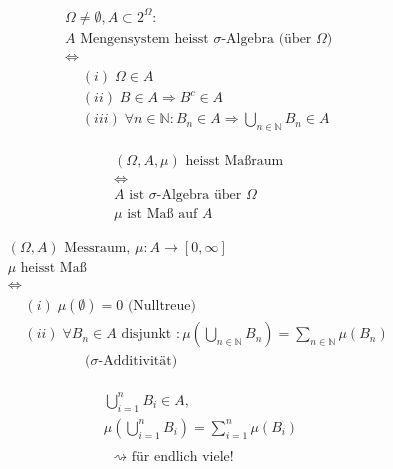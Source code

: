 \documentclass[a4paper]{article}
\begin{document}
{	{
		\begin{gather*}
			\Omega \neq \emptyset,
			A
			\subset 2 ^{\Omega}: \\
			A \text{ Mengensystem heisst $\sigma$-Algebra (über $\Omega$) } \\
			\Leftrightarrow \\
			\begin{align*}
				&(i) \; \Omega \in A \\
				&(ii) \; B \in A \Rightarrow B ^{c} \in A \\
				&(iii) \; \forall n \in \mathbb{N}: B_n \in A
				\Rightarrow \bigcup_{n \in \mathbb{N}}  B_n \in A
			\end{align*}
		\end{gather*}
	}
	\newpage

	{
		\begin{gather*}
			(\Omega, A, \mu) \text{ heisst Maßraum } \\
			\Leftrightarrow \\
			A \text{ ist $\sigma$-Algebra über $\Omega$ } \\
			\mu \text{ ist Maß auf $A$ }
		\end{gather*}
	}
	\newpage

	{
		\begin{gather*}
			(\Omega, A) \text{ Messraum, }
			\mu: A \to [0, \infty] \\
			\mu \text{ heisst Maß } \\
			\Leftrightarrow \\
			\begin{align*}
				&(i) \; \mu (\emptyset) = 0 \text{ (Nulltreue) } \\
				&(ii) \; \forall B_n \in A \text{ disjunkt }:
				\mu \left(
					\bigcup_{n \in \mathbb{N}}  B_n
				\right) = \sum_{n \in \mathbb{N}} \mu (B_n) \\
				&\qquad \qquad \text{ ($\sigma$-Additivität) }
			\end{align*}
		\end{gather*}
	}
	\newpage

	{
		\begin{gather*}
			\bigcup_{i=1}^{n} B_i \in A,
			\\
			\mu \left(
				\bigcup_{i=1}^{n} B_i
			\right) = 
			\sum_{i=1}^{n} \mu (B_i)
			\\
			\\
			\text{ $\rightsquigarrow$ für endlich viele! }
		\end{gather*}
	}
	\newpage

}
\end{document}
